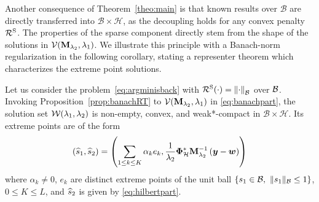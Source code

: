 \documentclass[12pt]{article}
\begin{document}

    Another consequence of Theorem~\ref{theo:main} is that known results over $\mathcal{B}$ are directly transferred into $\mathcal{B}\times \mathcal{H}$, as the decoupling holds for any convex penalty $\mathcal{R}^\mathrm{S}$. The properties of the sparse component directly stem from the shape of the solutions in $\mathcal{V}(\mathbf{M}_{\lambda_{2}}, \lambda_{1})$. We illustrate this principle with a Banach-norm regularization in the following corollary, stating a representer theorem which characterizes the extreme point solutions.

    \begin{corollary}
    \label{cor:main}
    Let us consider the problem~\eqref{eq:argminisback} with $\mathcal{R}^\mathrm{S}(\cdot) = \left\lVert\cdot\right\rVert_{\mathcal{B}} $ over $\mathcal{B}$. Invoking Proposition~\ref{prop:banachRT} to $\mathcal{V}(\mathbf{M}_{\lambda_{2}},\lambda_{1})$ in \eqref{eq:banachpart}, the solution set $\mathcal{W} (\lambda_{1},\lambda_{2})$ is non-empty, convex, and weak*-compact in $\mathcal{B}\times \mathcal{H}$. Its extreme points are of the form 
    \begin{equation} \label{eq:extreme}
        (\widehat{s}_1 , \widehat{s}_2 ) = \left( \sum_{1 \leq k \leq K} \alpha_k e_k , \frac{1}{\lambda_{2}}\bm{\Phi}_\mathcal{H}^* \mathbf{M}_{\lambda_{2}}^{-1} \left(\bm{y} - \bm{w}\right)\right)
    \end{equation}
    where $\alpha_k \neq 0$, $e_k$ are distinct extreme points of the unit ball $\{ s_1 \in \mathcal{B}, \ \| s_1 \|_{\mathcal{B}} \leq 1\}$, $0 \leq K \leq L$, and $\widehat{s}_2$ is given by \eqref{eq:hilbertpart}. 
    \end{corollary}
\end{document}
